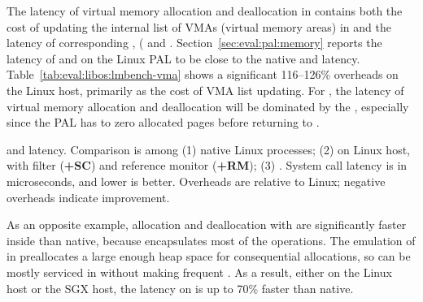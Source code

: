 \label{sec:eval:libos:vma}

The latency of virtual memory allocation
and deallocation in \thelibos{}
contains both the cost of updating the internal list of VMAs (virtual memory areas) in \thelibos{}
and the latency of corresponding \hostapis{}, ( and .
Section~\ref{sec:eval:pal:memory}
reports the latency of  and 
on the Linux PAL
to be close to the native 
and  latency.
Table~\ref{tab:eval:libos:lmbench-vma} shows a significant 116--126\% overheads
on the Linux host,
primarily as the cost of VMA list updating.
For \graphenesgx{},
the latency of virtual memory allocation
and deallocation will be dominated by the \hostapis{}, especially since the \sgx{} PAL has to zero allocated pages before returning to \thelibos{}.



\begin{table}[t!b!]

\caption{ and  latency. Comparison is among (1) native Linux processes; (2) \graphene{} on Linux host, with \seccomp{} filter ({\bf +SC}) and reference monitor ({\bf +RM}); (3) \graphenesgx{}.
System call latency is in microseconds, and lower is better.
Overheads are relative to Linux; negative overheads indicate improvement.} 
\label{tab:eval:libos:lmbench-vma}
\end{table}


As an opposite example, allocation and deallocation
with  are
significantly faster inside \thelibos{}
than native,
because \thelibos{} encapsulates most of the operations.
The emulation of  in \thelibos{}
preallocates a large enough
heap space for consequential allocations,
so  can be mostly serviced in \thelibos{}
without making frequent \hostapis{}.
As a result, either on the Linux host or the SGX host,
the latency on 
is up to 70\% faster than native.

